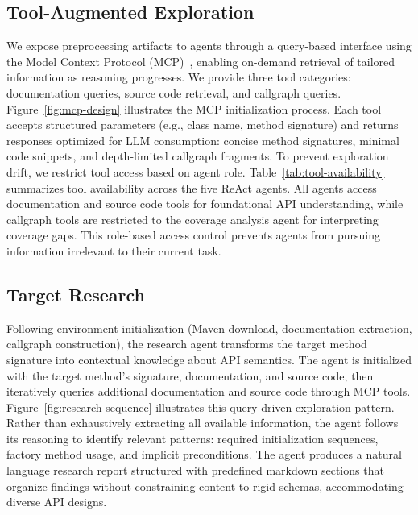 \subsection{Tool-Augmented Exploration}%
\label{subsec:tool-augmented-exploration}
%
We expose preprocessing artifacts to agents through a query-based interface using the Model Context Protocol (MCP)~\cite{mcp}, enabling on-demand retrieval of tailored information as reasoning progresses.
%
We provide three tool categories: documentation queries, source code retrieval, and callgraph queries. Figure~\ref{fig:mcp-design} illustrates the MCP initialization process. Each tool accepts structured parameters (e.g., class name, method signature) and returns responses optimized for LLM consumption: concise method signatures, minimal code snippets, and depth-limited callgraph fragments.
To prevent exploration drift, we restrict tool access based on agent role. Table~\ref{tab:tool-availability} summarizes tool availability across the five ReAct agents. All agents access documentation and source code tools for foundational API understanding, while callgraph tools are restricted to the coverage analysis agent for interpreting coverage gaps. This role-based access control prevents agents from pursuing information irrelevant to their current task.

% 
%
\subsection{Target Research}%
\label{subsec:target-research}
Following environment initialization (Maven download, documentation extraction, callgraph construction), the research agent transforms the target method signature into contextual knowledge about API semantics. The agent is initialized with the target method's signature, documentation, and source code, then iteratively queries additional documentation and source code through MCP tools. Figure~\ref{fig:research-sequence} illustrates this query-driven exploration pattern. Rather than exhaustively extracting all available information, the agent follows its reasoning to identify relevant patterns: required initialization sequences, factory method usage, and implicit preconditions. The agent produces a natural language research report structured with predefined markdown sections that organize findings without constraining content to rigid schemas, accommodating diverse API designs.
